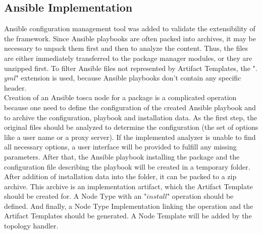 \subsection*{Ansible Implementation}
Ansible configuration management tool was added to validate the extensibility of the framework.
Since Ansible playbooks are often packed into archives, it may be necessary to unpack them first and then to analyze the content.
Thus, the files are either immediately transferred to the package manager modules, or they are unzipped first.
To filter Ansible files not represented by Artifact Templates, the ".$yml$" extension is used, because Ansible playbooks don't contain any specific header.\\
Creation of an Ansible \gls{tosca} node for a package is a complicated operation because one need to define the configuration of the created Ansible playbook and to archive the configuration, playbook and installation data. 
As the first step, the original files should be analyzed to determine the configuration (the set of options like a user name or a proxy server).
If the implemented analyzer is unable to find all necessary options, a user interface will be provided to fulfill any missing parameters.
After that, the Ansible playbook installing the package and the configuration file describing the playbook will be created in a temporary folder.
After addition of installation data into the folder, it can be packed to a zip archive.
This archive is an implementation artifact, which the Artifact Template should be created for.
A Node Type with an "$install$" operation %
should be defined.
And finally, a Node Type Implementation linking the operation and the Artifact Templates should be generated.
A Node Template will be added by the topology handler.
%	
